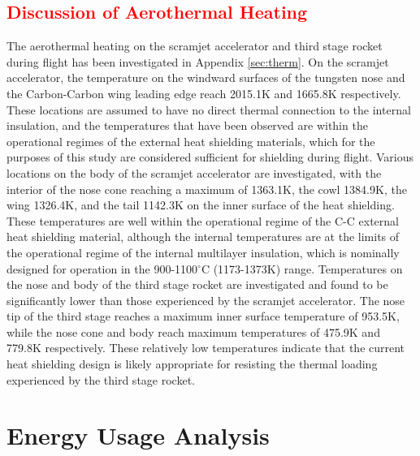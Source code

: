 \textcolor{red}{
	\section{Discussion of Aerothermal Heating}}\label{sec:therm2}
\noindent
The aerothermal heating on the scramjet accelerator and third stage rocket during flight has been investigated in Appendix \ref{sec:therm}. On the scramjet accelerator, the temperature on the windward surfaces of the tungsten nose and the Carbon-Carbon wing leading edge reach 2015.1K and 1665.8K respectively. 
These locations are assumed to have no direct thermal connection to the internal insulation, and the temperatures that have been observed are within the operational regimes of the external heat shielding materials, which for the purposes of this study are considered sufficient for shielding during flight.
Various locations on the body of the scramjet accelerator are investigated, with the interior of the nose cone reaching a maximum of 1363.1K, the cowl 1384.9K, the wing 1326.4K, and the tail 1142.3K on the inner surface of the heat shielding.
These temperatures are well within the operational regime of the C-C external heat shielding material, although the internal temperatures are at the limits of the operational regime of the internal multilayer insulation, which is nominally designed for operation in the 900-1100$^\circ$C (1173-1373K) range.
Temperatures on the nose and body of the third stage rocket are investigated and found to be significantly lower than those experienced by the scramjet accelerator. The nose tip of the third stage reaches a maximum inner surface temperature of 953.5K, while the nose cone and body reach maximum temperatures of 475.9K and 779.8K respectively. These relatively low temperatures indicate that the current heat shielding design is likely appropriate for resisting the thermal loading experienced by the third stage rocket.

\section{Energy Usage Analysis}


